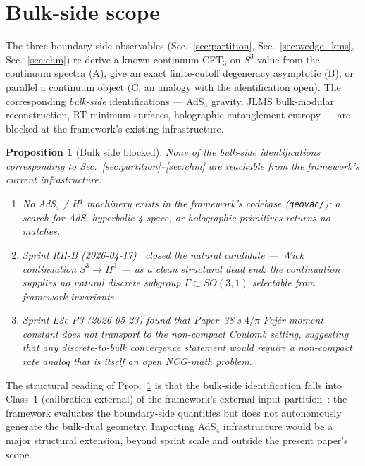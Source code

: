 \documentclass[11pt,a4paper]{article}
\theoremstyle{plain}
\newtheorem{proposition}[theorem]{Proposition}
\theoremstyle{definition}
\newcommand{\sthree}{S^{3}}
\begin{document}
\section{Bulk-side scope}
\label{sec:bulk_blocked}

The three boundary-side observables (Sec.~\ref{sec:partition},
Sec.~\ref{sec:wedge_kms}, Sec.~\ref{sec:chm}) re-derive a known continuum
CFT$_{3}$-on-$\sthree$ value from the continuum spectra (A), give an exact finite-cutoff degeneracy
asymptotic (B), or parallel a continuum object (C, an analogy with the
identification open). The corresponding \emph{bulk-side} identifications --- AdS$_{4}$
gravity, JLMS bulk-modular reconstruction, RT minimum surfaces,
holographic entanglement entropy --- are blocked at the framework's
existing infrastructure.

\begin{proposition}[Bulk side blocked]
\label{prop:bulk_blocked}
None of the bulk-side identifications corresponding to
Sec.~\ref{sec:partition}--\ref{sec:chm} are reachable from the
framework's current infrastructure:

\begin{enumerate}
\item No AdS$_{4}$ / H$^{4}$ machinery exists in the framework's
codebase (\texttt{geovac/}); a search for AdS, hyperbolic-4-space,
or holographic primitives returns no matches.

\item Sprint RH-B (2026-04-17)~\cite{paper29} closed the natural
candidate --- Wick continuation $\sthree \to H^{3}$ --- as a clean
structural dead end: the continuation supplies no natural discrete
subgroup $\Gamma \subset SO(3,1)$ selectable from framework
invariants.

\item Sprint L3e-P3 (2026-05-23) found that Paper~38's $4/\pi$ Fej\'er-moment constant
does \emph{not} transport to the non-compact Coulomb setting,
suggesting that any discrete-to-bulk convergence statement would
require a non-compact rate analog that is itself an open NCG-math
problem.
\end{enumerate}
\end{proposition}

The structural reading of Prop.~\ref{prop:bulk_blocked} is that the
bulk-side identification falls into Class~1 (calibration-external)
of the framework's external-input partition~\cite{debug:external_input_three_class_partition}:
the framework evaluates the boundary-side quantities
but does not autonomously generate the bulk-dual geometry. Importing
AdS$_{4}$ infrastructure would be a major structural extension,
beyond sprint scale and outside the present paper's scope.
\end{document}
